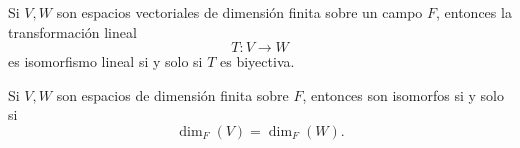 \documentclass[12pt,a4paper]{book}
\begin{document}
    \begin{proposicion}
        Si $V, W$ son espacios vectoriales de dimensión finita sobre un campo $F$, entonces la transformación lineal
        \begin{equation*}
            T: V \to W
        \end{equation*}
        es isomorfismo lineal si y solo si $T$ es biyectiva.
    \end{proposicion}

    \begin{proposicion}
        Si $V, W$ son espacios de dimensión finita sobre $F$, entonces son isomorfos si y solo si
        \begin{equation*}
            \dim_F(V) = \dim_F(W).
        \end{equation*}
    \end{proposicion}
\end{document}

